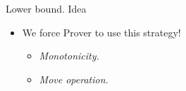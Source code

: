 \begin{frame}{Lower bound. Idea}

    \begin{center}
                
    \end{center}


    \pause
    \pause
    \pause
    \pause
    \pause
    \pause
    \pause
    \pause
    \begin{itemize}
        \item We force Prover to use this strategy!
            \pause
            \begin{itemize}
                \item \emph{Monotonicity.}
                    \pause
                \item \emph{Move operation.}
            \end{itemize}
    \end{itemize}



\end{frame}

